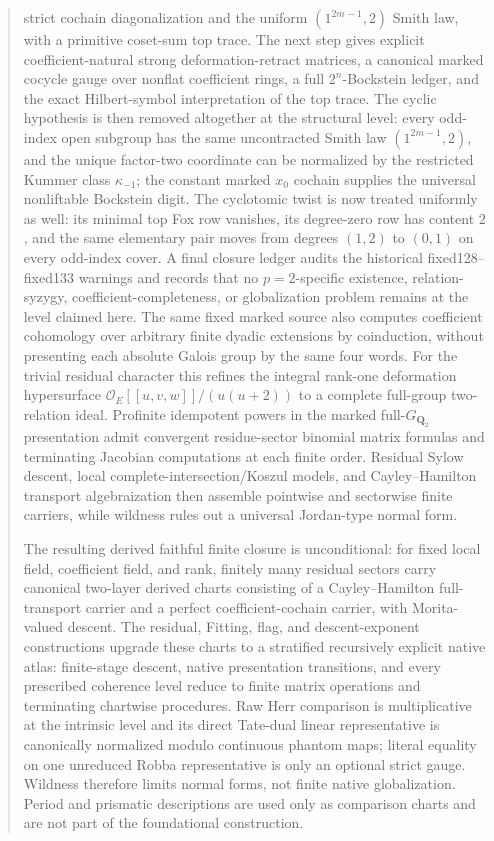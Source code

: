 \documentclass[11pt]{article}
\theoremstyle{definition}
\begin{document}
\begin{abstract}
strict cochain diagonalization and the uniform $(1^{2m-1},2)$ Smith law, with a primitive coset-sum top trace.  The next step gives explicit coefficient-natural strong deformation-retract matrices, a canonical marked cocycle gauge over nonflat coefficient rings, a full $2^n$-Bockstein ledger, and the exact Hilbert-symbol interpretation of the top trace.  The cyclic hypothesis is then removed altogether at the structural level: every odd-index open subgroup has the same uncontracted Smith law $(1^{2m-1},2)$, and the unique factor-two coordinate can be normalized by the restricted Kummer class $\kappa_{-1}$; the constant marked $x_0$ cochain supplies the universal nonliftable Bockstein digit.  The cyclotomic twist is now treated uniformly as well: its minimal top Fox row vanishes, its degree-zero row has content $2$, and the same elementary pair moves from degrees $(1,2)$ to $(0,1)$ on every odd-index cover.  A final closure ledger audits the historical fixed128--fixed133 warnings and records that no $p=2$-specific existence, relation-syzygy, coefficient-completeness, or globalization problem remains at the level claimed here.  The same fixed marked source also computes coefficient cohomology over arbitrary finite dyadic extensions by coinduction, without presenting each absolute Galois group by the same four words.  For the trivial residual character this refines the integral rank-one deformation hypersurface $\mathcal O_E[[u,v,w]]/(u(u+2))$ to a complete full-group two-relation ideal.  Profinite idempotent powers in the marked full-$G_{\mathbf Q_2}$ presentation admit convergent residue-sector binomial matrix formulas and terminating Jacobian computations at each finite order.  Residual Sylow descent, local complete-intersection/Koszul models, and Cayley--Hamilton transport algebraization then assemble pointwise and sectorwise finite carriers, while wildness rules out a universal Jordan-type normal form.

The resulting derived faithful finite closure is unconditional: for fixed local field, coefficient field, and rank, finitely many residual sectors carry canonical two-layer derived charts consisting of a Cayley--Hamilton full-transport carrier and a perfect coefficient-cochain carrier, with Morita-valued descent.  The residual, Fitting, flag, and descent-exponent constructions upgrade these charts to a stratified recursively explicit native atlas: finite-stage descent, native presentation transitions, and every prescribed coherence level reduce to finite matrix operations and terminating chartwise procedures.  Raw Herr comparison is multiplicative at the intrinsic level and its direct Tate-dual linear representative is canonically normalized modulo continuous phantom maps; literal equality on one unreduced Robba representative is only an optional strict gauge.  Wildness therefore limits normal forms, not finite native globalization.  Period and prismatic descriptions are used only as comparison charts and are not part of the foundational construction.
\end{abstract}
\end{document}
